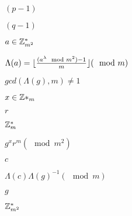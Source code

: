 \documentclass[10pt]{book}
\begin{document}
\begin{mdSnippets}
\begin{mdInlineSnippet}[fc86261874dd92078554f3ac92efbca8]
$(p-1)$\end{mdInlineSnippet}%
\begin{mdInlineSnippet}[64e3bc24594a6cc05b17e2cfdc0a7d60]%
$(q-1)$\end{mdInlineSnippet}%
\begin{mdInlineSnippet}[e06102eb4104d9445f572417dcbdd376]%
$a\in\mathbb{Z}^*_{m^2}$\end{mdInlineSnippet}%
\begin{mdInlineSnippet}[9fb6bc934fe51fc884a1672280d2227e]%
$\Lambda(a)= \lfloor \tfrac{(a^\lambda \mod m^2)-1}{m} \rfloor (\mod m)$\end{mdInlineSnippet}%
\begin{mdInlineSnippet}%
$gcd(\Lambda(g),m)\neq 1$\end{mdInlineSnippet}%
\begin{mdInlineSnippet}[6f36957a22ea99c5acf37b92c330af53]%
$x\in\mathbb{Z}*_m$\end{mdInlineSnippet}%
\begin{mdInlineSnippet}[4b43b0aee35624cd95b910189b3dc231]%
$r$\end{mdInlineSnippet}%
\begin{mdInlineSnippet}[9fc929ca8e961b6fb602959db12ff119]%
$\mathbb{Z}^*_m$\end{mdInlineSnippet}%
\begin{mdInlineSnippet}%
$g^xr^m (\mod m^2)$\end{mdInlineSnippet}%
\begin{mdInlineSnippet}[4a8a08f09d37b73795649038408b5f33]%
$c$\end{mdInlineSnippet}%
\begin{mdInlineSnippet}[cd8d0c812d396adce71bc1c6b070ec69]%
$\Lambda(c)\Lambda(g)^{-1} (\mod m)$\end{mdInlineSnippet}%
\begin{mdInlineSnippet}[b2f5ff47436671b6e533d8dc3614845d]%
$g$\end{mdInlineSnippet}%
\begin{mdInlineSnippet}[20328984c5fd8e5448047e89129a43c9]%
$\mathbb{Z}^*_{m^2}$\end{mdInlineSnippet}%
\begin{mdInlineSnippet}[6f8f57715090da2632453988d9a1501b]%

\end{mdInlineSnippet}
\end{mdSnippets}
\end{document}
